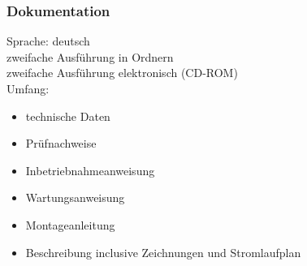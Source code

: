 \subsubsection*{Dokumentation}
Sprache: deutsch\\
zweifache Ausführung in Ordnern\\
zweifache Ausführung elektronisch (CD-ROM)\\

Umfang:
\begin{itemize}[noitemsep]
    \item technische Daten
    \item Prüfnachweise
    \item Inbetriebnahmeanweisung
    \item Wartungsanweisung
    \item Montageanleitung 
    \item Beschreibung inclusive Zeichnungen und Stromlaufplan
\end{itemize}
